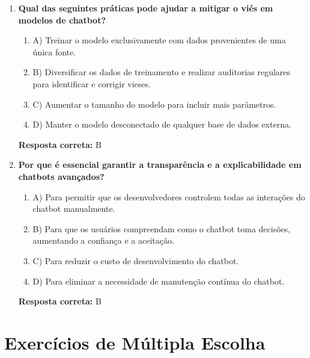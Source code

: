 \documentclass[14pt,a4paper,oneside]{book}
\begin{document}
\begin{enumerate}
	\item \textbf{Qual das seguintes práticas pode ajudar a mitigar o viés em modelos de chatbot?}
	\begin{enumerate}[label=\alph*)]
		\item A) Treinar o modelo exclusivamente com dados provenientes de uma única fonte.
		\item B) Diversificar os dados de treinamento e realizar auditorias regulares para identificar e corrigir vieses.
		\item C) Aumentar o tamanho do modelo para incluir mais parâmetros.
		\item D) Manter o modelo desconectado de qualquer base de dados externa.
	\end{enumerate}
	\vspace{5mm}
	\textbf{Resposta correta:} B
	
	\item \textbf{Por que é essencial garantir a transparência e a explicabilidade em chatbots avançados?}
	\begin{enumerate}[label=\alph*)]
		\item A) Para permitir que os desenvolvedores controlem todas as interações do chatbot manualmente.
		\item B) Para que os usuários compreendam como o chatbot toma decisões, aumentando a confiança e a aceitação.
		\item C) Para reduzir o custo de desenvolvimento do chatbot.
		\item D) Para eliminar a necessidade de manutenção contínua do chatbot.
	\end{enumerate}
	\vspace{5mm}
	\textbf{Resposta correta:} B
	
\end{enumerate}

\section*{Exercícios de Múltipla Escolha}
\end{document}

